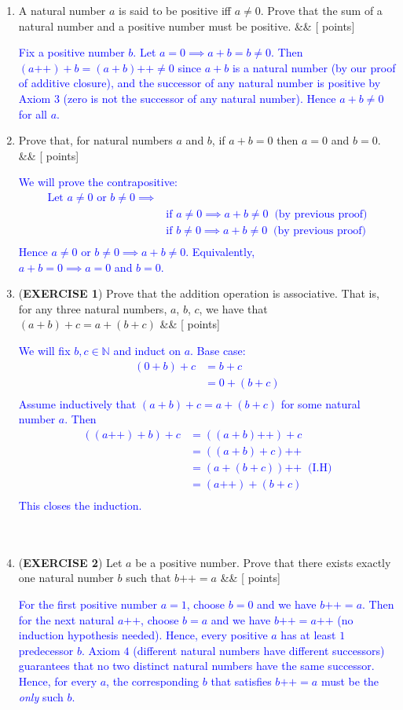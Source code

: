 \documentclass[12pt]{article}
\newcommand{\points}[1]{\hfill {[#1 points]}}
\newcommand{\problem}[2][]{%
  \item {#2}%
  \ifx&#1&%
  \else%
    \points{#1}%
  \fi
  \par\vspace{0.5em}
}
\begin{document}
\begin{enumerate}[leftmargin=*, label=\textbf{\arabic*.}]
	\problem{A natural number $a$ is said to be positive iff $a \neq 0$. Prove that the sum of a natural number and a positive number must be positive.}
	\textcolor{blue}{Fix a positive number $b$. Let $a = 0 \implies a + b = b \neq 0$. Then $(a\text{++}) + b = (a+b)\text{++} \neq 0$ since $a + b$ is a natural number (by our proof of additive closure), and the successor of any natural number is positive by Axiom $3$ (zero is not the successor of any natural number). Hence $a + b \neq 0$ for all $a$.}
	
	\problem{Prove that, for natural numbers $a$ and $b$, if $a + b = 0$ then $a = 0$ and $b = 0$.}
	\textcolor{blue}{We will prove the contrapositive:
	\begin{align*}
	\text{Let $a \neq 0$ or $b \neq 0$} \implies& \\
	& \text{if $a \neq 0$} \implies a+b \neq 0 \;\; \text{(by previous proof)} \\
	& \text{if $b \neq 0$} \implies a+b \neq 0 \;\; \text{(by previous proof)} \\
	\end{align*}
	Hence $a \neq 0$ or $b \neq 0 \implies a+b \neq 0$. Equivalently, \\ $a+b = 0 \implies a = 0$ and $b = 0$.}
	
    \problem{(\textbf{EXERCISE 1}) Prove that the addition operation is associative. That is, for any three natural numbers, $a$, $b$, $c$, we have that $(a+b)+c = a+(b+c)$}
    	\textcolor{blue}{We will fix $b,c \in \mathbb{N}$ and induct on $a$. Base case:
	\begin{align*}
	(0 + b) + c &=b + c \\
	&= 0 + (b + c)\\
	\end{align*}
	Assume inductively that $(a + b) + c = a + (b + c)$ for some natural number $a$. Then
	\begin{align*}
	((a\text{++}) + b) + c &= ((a + b)\text{++}) + c\\
	&= ((a+b) + c)\text{++}  \\
	& = (a + (b + c))\text{++} \;\; \text{(I.H)} \\
	&= (a\text{++}) + (b+c) \\
	\end{align*}
	This closes the induction.}
	\\ \\ \\
	\problem{(\textbf{EXERCISE 2}) Let $a$ be a positive number. Prove that there exists exactly one natural number $b$ such that $b\text{++} = a$}
	\textcolor{blue}{ 
	For the first positive number $a = 1$, choose $b = 0$ and we have $b\text{++} = a$. Then for the next natural $a\text{++}$, choose $b = a$ and we have $b\text{++} = a\text{++}$ (no induction hypothesis needed). Hence, every positive $a$ has at least $1$ predecessor $b$. Axiom $4$ (different natural numbers have different successors) guarantees that no two distinct natural numbers have the same successor. Hence, for every $a$, the corresponding $b$ that satisfies $b\text{++} = a$ must be the \textit{only} such $b$. \\ \\}
	

\end{enumerate}
\end{document}
